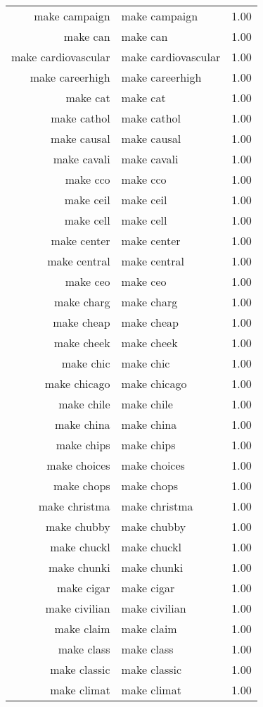 \begin{table}[ht]
\begin{tabular}{rlr}
  make campaign & make campaign & 1.00 \\ 
  make can & make can & 1.00 \\ 
  make cardiovascular & make cardiovascular & 1.00 \\ 
  make careerhigh & make careerhigh & 1.00 \\ 
  make cat & make cat & 1.00 \\ 
  make cathol & make cathol & 1.00 \\ 
  make causal & make causal & 1.00 \\ 
  make cavali & make cavali & 1.00 \\ 
  make cco & make cco & 1.00 \\ 
  make ceil & make ceil & 1.00 \\ 
  make cell & make cell & 1.00 \\ 
  make center & make center & 1.00 \\ 
  make central & make central & 1.00 \\ 
  make ceo & make ceo & 1.00 \\ 
  make charg & make charg & 1.00 \\ 
  make cheap & make cheap & 1.00 \\ 
  make cheek & make cheek & 1.00 \\ 
  make chic & make chic & 1.00 \\ 
  make chicago & make chicago & 1.00 \\ 
  make chile & make chile & 1.00 \\ 
  make china & make china & 1.00 \\ 
  make chips & make chips & 1.00 \\ 
  make choices & make choices & 1.00 \\ 
  make chops & make chops & 1.00 \\ 
  make christma & make christma & 1.00 \\ 
  make chubby & make chubby & 1.00 \\ 
  make chuckl & make chuckl & 1.00 \\ 
  make chunki & make chunki & 1.00 \\ 
  make cigar & make cigar & 1.00 \\ 
  make civilian & make civilian & 1.00 \\ 
  make claim & make claim & 1.00 \\ 
  make class & make class & 1.00 \\ 
  make classic & make classic & 1.00 \\ 
  make climat & make climat & 1.00 \\ 

\end{tabular}
\end{table}
